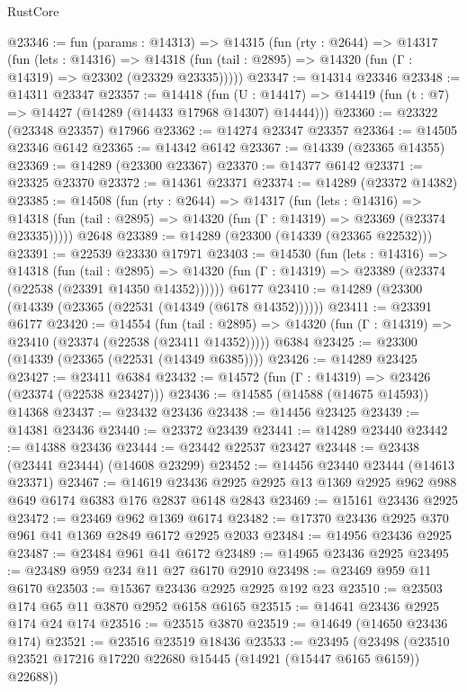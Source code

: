 \begin{lexlean}{RustCore}
\begin{coremodule}
@23346 := fun (params : @14313) =>
  @14315
    (fun (rty : @2644) =>
    @14317
      (fun (lets : @14316) =>
      @14318 (fun (tail : @2895) => @14320 (fun (Γ : @14319) => @23302 (@23329 @23335)))))
@23347 := @14314 @23346
@23348 := @14311 @23347
@23357 := @14418
    (fun (U : @14417) => @14419 (fun (t : @7) => @14427 (@14289 (@14433 @17968 @14307) @14444)))
@23360 := @23322 (@23348 @23357) @17966
@23362 := @14274 @23347 @23357
@23364 := @14505 @23346 @6142
@23365 := @14342 @6142
@23367 := @14339 (@23365 @14355)
@23369 := @14289 (@23300 @23367)
@23370 := @14377 @6142
@23371 := @23325 @23370
@23372 := @14361 @23371
@23374 := @14289 (@23372 @14382)
@23385 := @14508
    (fun (rty : @2644) =>
    @14317
      (fun (lets : @14316) =>
      @14318 (fun (tail : @2895) => @14320 (fun (Γ : @14319) => @23369 (@23374 @23335)))))
    @2648
@23389 := @14289 (@23300 (@14339 (@23365 @22532)))
@23391 := @22539 @23330 @17971
@23403 := @14530
    (fun (lets : @14316) =>
    @14318
      (fun (tail : @2895) =>
      @14320 (fun (Γ : @14319) => @23389 (@23374 (@22538 (@23391 @14350 @14352))))))
    @6177
@23410 := @14289 (@23300 (@14339 (@23365 (@22531 (@14349 (@6178 @14352))))))
@23411 := @23391 @6177
@23420 := @14554
    (fun (tail : @2895) => @14320 (fun (Γ : @14319) => @23410 (@23374 (@22538 (@23411 @14352)))))
    @6384
@23425 := @23300 (@14339 (@23365 (@22531 (@14349 @6385))))
@23426 := @14289 @23425
@23427 := @23411 @6384
@23432 := @14572 (fun (Γ : @14319) => @23426 (@23374 (@22538 @23427)))
@23436 := @14585 (@14588 (@14675 @14593)) @14368
@23437 := @23432 @23436
@23438 := @14456 @23425
@23439 := @14381 @23436
@23440 := @23372 @23439
@23441 := @14289 @23440
@23442 := @14388 @23436
@23444 := @23442 @22537 @23427
@23448 := @23438 (@23441 @23444) (@14608 @23299)
@23452 := @14456 @23440 @23444 (@14613 @23371)
@23467 := @14619
    @23436
    @2925
    @2925
    @13
    @1369
    @2925
    @962
    @988
    @649
    @6174
    @6383
    @176
    @2837
    @6148
    @2843
@23469 := @15161 @23436 @2925
@23472 := @23469 @962 @1369 @6174
@23482 := @17370 @23436 @2925 @370 @961 @41 @1369 @2849 @6172 @2925 @2033
@23484 := @14956 @23436 @2925
@23487 := @23484 @961 @41 @6172
@23489 := @14965 @23436 @2925
@23495 := @23489 @959 @234 @11 @27 @6170 @2910
@23498 := @23469 @959 @11 @6170
@23503 := @15367 @23436 @2925 @2925 @192 @23
@23510 := @23503 @174 @65 @11 @3870 @2952 @6158 @6165
@23515 := @14641 @23436 @2925 @174 @24 @174
@23516 := @23515 @3870
@23519 := @14649 (@14650 @23436 @174)
@23521 := @23516 @23519 @18436
@23533 := @23495
    (@23498 (@23510 @23521 @17216 @17220 @22680 @15445 (@14921 (@15447 @6165 @6159)) @22688))

\end{coremodule}
\end{lexlean}
